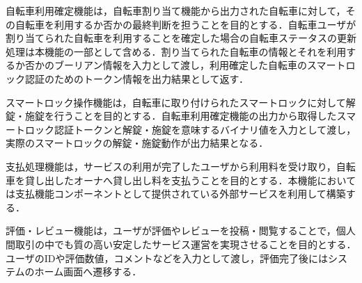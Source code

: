           \par 自転車利用確定機能は，自転車割り当て機能から出力された自転車に対して，その自転車を利用するか否かの最終判断を担うことを目的とする．自転車ユーザが割り当てられた自転車を利用することを確定した場合の自転車ステータスの更新処理は本機能の一部として含める．割り当てられた自転車の情報とそれを利用するか否かのブーリアン情報を入力として渡し，利用確定した自転車のスマートロック認証のためのトークン情報を出力結果として返す．
          \par スマートロック操作機能は，自転車に取り付けられたスマートロックに対して解錠・施錠を行うことを目的とする．自転車利用確定機能の出力から取得したスマートロック認証トークンと解錠・施錠を意味するバイナリ値を入力として渡し，実際のスマートロックの解錠・施錠動作が出力結果となる．
          \par 支払処理機能は，サービスの利用が完了したユーザから利用料を受け取り，自転車を貸し出したオーナへ貸し出し料を支払うことを目的とする．本機能においては支払機能コンポーネントとして提供されている外部サービスを利用して構築する．
          \par 評価・レビュー機能は，ユーザが評価やレビューを投稿・閲覧することで，個人間取引の中でも質の高い安定したサービス運営を実現させることを目的とする．ユーザのIDや評価数値，コメントなどを入力として渡し，評価完了後にはシステムのホーム画面へ遷移する．
      
